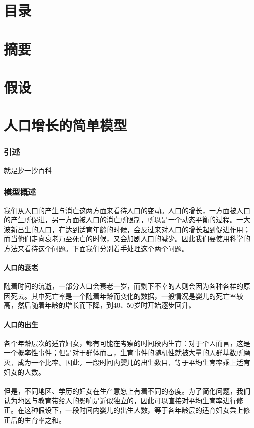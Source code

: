 \documentclass[11pt]{article}
\begin{document}
\part{目录}

\part{摘要}

\part{假设}

\part{人口增长的简单模型}
\section{引述}
	就是抄一抄百科
\section{模型概述}
我们从人口的产生与消亡这两方面来看待人口的变动。人口的增长，一方面被人口的产生所促进，另一方面被人口的消亡所限制，所以是一个动态平衡的过程。一大波新出生的人口，在达到适育年龄的时候，会反过来对人口的增长起到促进作用；而当他们走向衰老乃至死亡的时候，又会加剧人口的减少。因此我们要使用科学的方法来看待这个问题。下面我们分别着手处理这个两个问题。
	\subsection{人口的衰老}
随着时间的流逝，一部分人口会衰老一岁，而剩下不幸的人则会因为各种各样的原因死去。其中死亡率是一个随着年龄而变化的数据，一般情况是婴儿的死亡率较高，然后随着年龄的增长而下降，到40、50岁时开始逐步回升。
	\subsection{人口的出生}
各个年龄层次的适育妇女，都有可能在考察的时间段内生育：对于个人而言，这是一个概率性事件；但是对于群体而言，生育事件的随机性就被大量的人群基数所磨灭，成为一个比率。因此，一段时间内婴儿的出生数目，等于平均生育率乘上适育妇女的人数。\\\\
\indent
但是，不同地区、学历的妇女在生产意愿上有着不同的态度。为了简化问题，我们认为地区与教育带给人的影响是近似独立的，因此可以直接对平均生育率进行修正。在这种假设下，一段时间内婴儿的出生人数，等于各年龄层的适育妇女乘上修正后的生育率之和。
\end{document}
